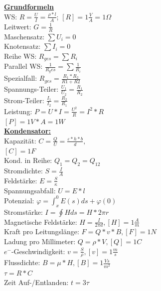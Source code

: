 \documentclass[11pt]{article}
\begin{document}
\begin{landscape}

\begin{minipage}{0.45\textwidth}
\underline{\textbf{Grundformeln}}\\
WS: $R = \frac{U}{I} = \frac{\rho * l}{A}$; $[R] = 1\frac{V}{A} =1 \Omega$ \\
Leitwert: $G = \frac{1}{R}$\\
Maschensatz: $\sum U_i = 0$\\
Knotensatz: $\sum I_i = 0$\\
Reihe WS: $R_{ges} = \sum R_i$\\
Parallel WS: $\frac{1}{R_ges} = \sum \frac{1}{R_i}$\\
\phantom{ss} Spezialfall: $R_{ges} = \frac{R_1 * R_2}{R1+R2} $\\
Spannungs-Teiler: $\frac{U_1}{U_2} = \frac{R_1}{R_2}$\\
Strom-Teiler: $\frac{I_1}{I_2} = \frac{R_2}{R_1}$\\
Leistung: $P =U*I = \frac{U^2}{R} = I^2*R $ \\
\phantom{ssssssssss} $[P] = 1V*A =1 W$\\
\underline{\textbf{Kondensator:}}\\
Kapazität: $C = \frac{Q}{U} = \frac{\varepsilon * h * b}{d},$\\
\phantom{ssssssssssii} $[C]=1F$\\
Kond. in Reihe: $Q_1 = Q_2 = Q_{12}$\\
Stromdichte: $S=\frac{I}{A}$\\
Feldstärke: $E=\frac{S}{\kappa}$\\
Spannungsabfall: $U=E*l$\\
Potenzial: $\varphi = \int_x^0 E(s)ds + \varphi(0)$\\
Stromstärke: $I = \oint H ds = H * 2\pi r$\\
Magnetische Feldstärke: $H = \frac{I}{2\pi d}, [H] = 1\frac{A}{m}$\\
Kraft pro Leitungslänge: $F=Q*v*B, [F] = 1N$\\
Ladung pro Millimeter: $Q = \rho * V, [Q] = 1C$\\
$e^-$-Geschwindigkeit: $v = \frac{S}{\rho}, [v] = 1\frac{m}{s}$\\
Flussdichte: $B=\mu*H, [B] = 1 \frac{Vs}{m^2}$\\


$\tau = R*C$\\
Zeit Auf-/Entlanden: $t = 3\tau$\\


\end{minipage}
\end{landscape}
\end{document}
